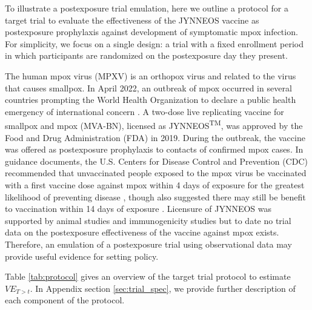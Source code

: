 \documentclass[11pt]{article}
\begin{document}
To illustrate a postexposure trial emulation, here we outline a protocol for a target trial to evaluate the effectiveness of the JYNNEOS vaccine as postexposure prophylaxis against development of symptomatic mpox infection. For simplicity, we focus on a single design: a trial with a fixed enrollment period in which participants are randomized on the postexposure day they present.

The human mpox virus (MPXV) is an orthopox virus and related to the virus that causes smallpox. In April 2022, an outbreak of mpox occurred in several countries prompting the World Health Organization to declare a public health emergency of international concern \cite{nuzzo_who_2022}. A two-dose live replicating vaccine for smallpox and mpox (MVA-BN), licensed as JYNNEOS\textsuperscript{TM}, was approved by the Food and Drug Administration (FDA) in 2019. During the outbreak, the vaccine was offered as postexposure prophylaxis to contacts of confirmed mpox cases. In guidance documents, the U.S. Centers for Disease Control and Prevention (CDC) recommended that unvaccinated people exposed to the mpox virus be vaccinated with a first vaccine dose against mpox within 4 days of exposure for the greatest likelihood of preventing disease \cite{cdc_mpox_2023-1}, though also suggested there may still be benefit to vaccination within 14 days of exposure \cite{kecmanovic1975einfluss,sommer_1972_1974}. Licensure of JYNNEOS was supported by animal studies \cite{earl_rapid_2008,keckler_effects_2013,hatch_assessment_2013,samuelsson_survival_2008} and immunogenicity studies \cite{pittman_phase_2019} but to date no trial data on the postexposure effectiveness of the vaccine against mpox exists. Therefore, an emulation of a postexposure trial using observational data may provide useful evidence for setting policy.

Table \ref{tab:protocol} gives an overview of the target trial protocol to estimate $VE_{T>t}$. In Appendix section \ref{sec:trial_spec}, we provide further description of each component of the protocol.
\end{document}
